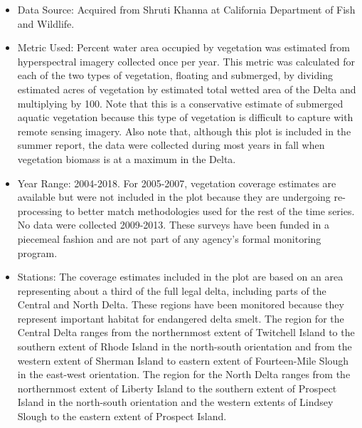 \documentclass[
]{book}
\providecommand{\tightlist}{%
  \setlength{\itemsep}{0pt}\setlength{\parskip}{0pt}}
\begin{document}
\begin{itemize}
\tightlist
\item
  Data Source: Acquired from Shruti Khanna at California Department of Fish and Wildlife.
\item
  Metric Used: Percent water area occupied by vegetation was estimated from hyperspectral imagery collected once per year. This metric was calculated for each of the two types of vegetation, floating and submerged, by dividing estimated acres of vegetation by estimated total wetted area of the Delta and multiplying by 100. Note that this is a conservative estimate of submerged aquatic vegetation because this type of vegetation is difficult to capture with remote sensing imagery. Also note that, although this plot is included in the summer report, the data were collected during most years in fall when vegetation biomass is at a maximum in the Delta.
\item
  Year Range: 2004-2018. For 2005-2007, vegetation coverage estimates are available but were not included in the plot because they are undergoing re-processing to better match methodologies used for the rest of the time series. No data were collected 2009-2013. These surveys have been funded in a piecemeal fashion and are not part of any agency's formal monitoring program.
\item
  Stations: The coverage estimates included in the plot are based on an area representing about a third of the full legal delta, including parts of the Central and North Delta. These regions have been monitored because they represent important habitat for endangered delta smelt. The region for the Central Delta ranges from the northernmost extent of Twitchell Island to the southern extent of Rhode Island in the north-south orientation and from the western extent of Sherman Island to eastern extent of Fourteen-Mile Slough in the east-west orientation. The region for the North Delta ranges from the northernmost extent of Liberty Island to the southern extent of Prospect Island in the north-south orientation and the western extents of Lindsey Slough to the eastern extent of Prospect Island.
\end{itemize}

  
\end{document}
